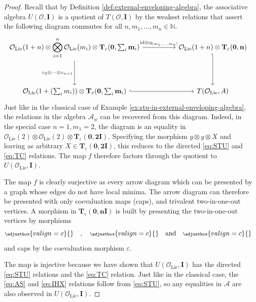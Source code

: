 \begin{proof}
	Recall that by Definition \ref{def:external-enveloping-algebra}, the associative algebra \(U(\mathcal{O}, \mathbf{I})\) is a quotient of \(T(\mathcal{O}, \mathbf{I})\) by the weakest relations that assert the following diagram commutes for all \(n, m_{1}, \dots, m_{n} \in \mathbb{N}\).
	\[\begin{tikzcd}
		{\mathcal{O}_{\text{Lie}}(1 + n) \otimes \displaystyle\bigotimes_{i = 1}^{n}\mathcal{O}_{\text{Lie}}(m_{i}) \otimes \mathbf{T}_{\varepsilon}(\mathbf{0}, \textstyle\sum_{i}\mathbf{m}_{i})} && {\mathcal{O}_{\text{Lie}}(1 + n) \otimes \mathbf{T}_{\varepsilon}(\mathbf{0}, \mathbf{n})}\\
		\\
		{\mathcal{O}_{\text{Lie}}(1 + (\sum_{i}m_{i})) \otimes \mathbf{T}_{\varepsilon}(\mathbf{0}, \textstyle\sum_{i}\mathbf{m}_{i})} && {T(\mathcal{O}_{\text{Lie}}, A)}
		\arrow["{\id \otimes \eta_{(m_{1}, \dots, m_{n})}}", from=1-1, to=1-3]
		\arrow["{\circ_{2} \otimes \cdots\otimes\circ_{n+1}}"', from=1-1, to=3-1]
		\arrow[hook', from=1-3, to=3-3]
		\arrow[hook, from=3-1, to=3-3]
	\end{tikzcd}\]
	Just like in the classical case of Example \ref{ex:stu-in-external-enveloping-algebra}, the relations in the algebra \(\mathcal{A}_{w}\) can be recovered from this diagram. Indeed, in the special case \(n = 1, m_{1} = 2\), the diagram is an equality in \(\mathcal{O}_{\text{Lie}}(2) \otimes \mathcal{O}_{\text{Lie}}(2) \otimes \mathbf{T}_{\varepsilon}(\mathbf{0}, \mathbf{2I})\). Specifying the morphism \(y \otimes y \otimes X\) and leaving as arbitrary \(X \in \mathbf{T}_{\varepsilon}(\mathbf{0}, \mathbf{2I})\), this reduces to the directed \ref{eq:STU} and \ref{eq:TC} relations. The map \(f\) therefore factors through the quotient to \(U(\mathcal{O}_{\text{Lie}}, \mathbf{I})\).

	The map \(f\) is clearly surjective as every arrow diagram which can be presented by a graph whose edges do not have local minima. The arrow diagram can therefore be presented with only coevaluation maps (caps), and trivalent two-in-one-out vertices. A morphism in \(\mathbf{T}_{\varepsilon}(\mathbf{0}, \mathbf{nI})\) is built by presenting the two-in-one-out vertices by morphisms
	\[
		{\scriptsize
		\def\svgscale{0.38}
		\adjustbox{valign=c}{}
		}
		\quad
		,
		\quad
		{\scriptsize
		\def\svgscale{0.38}
		\adjustbox{valign=c}{}
		}
		\quad
		\text{and}
		\quad
		{\scriptsize
		\def\svgscale{0.38}
		\adjustbox{valign=c}{}
		}
	\]
	and caps by the coevaluation morphism \(\varepsilon\).

	The map is injective because we have shown that \(U(\mathcal{O}_{\text{Lie}}, \mathbf{I})\) has the directed \ref{eq:STU} relations and the \ref{eq:TC} relation. Just like in the classical case, the \ref{eq:AS} and \ref{eq:IHX} relations follow from \ref{eq:STU}, so any equalities in \(\mathcal{A}\) are also observed in \(U(\mathcal{O}_{\text{Lie}}, \mathbf{I})\).
\end{proof}


